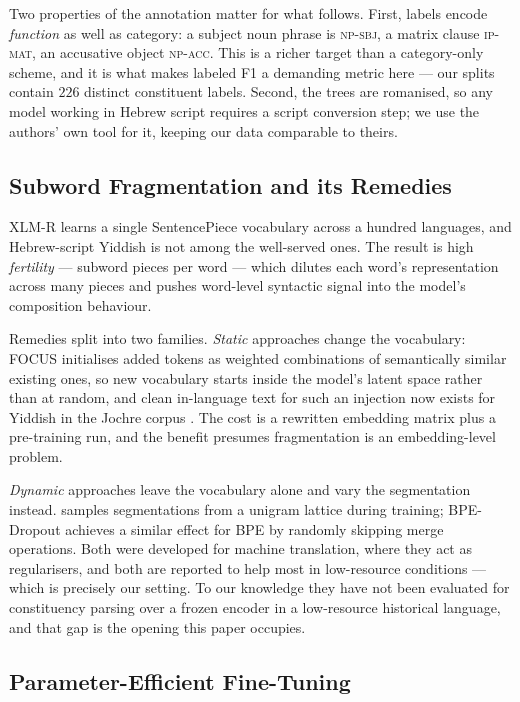\documentclass[11pt]{article}
\begin{document}
Two properties of the annotation matter for what follows. First, labels encode
\emph{function} as well as category: a subject noun phrase is \textsc{np-sbj}, a
matrix clause \textsc{ip-mat}, an accusative object \textsc{np-acc}. This is a
richer target than a category-only scheme, and it is what makes labeled F1 a
demanding metric here --- our splits contain $226$ distinct constituent labels.
Second, the trees are romanised, so any model working in Hebrew script requires a
script conversion step; we use the authors' own tool for it, keeping our data
comparable to theirs.

\subsection{Subword Fragmentation and its Remedies}

XLM-R \citep{conneau-etal-2020-unsupervised} learns a single SentencePiece
vocabulary across a hundred languages, and Hebrew-script Yiddish is not among the
well-served ones. The result is high \emph{fertility} --- subword pieces per word
--- which dilutes each word's representation across many pieces and pushes
word-level syntactic signal into the model's composition behaviour.

Remedies split into two families. \emph{Static} approaches change the
vocabulary: FOCUS \citep{dobler-de-melo-2023-focus} initialises added tokens as
weighted combinations of semantically similar existing ones, so new vocabulary
starts inside the model's latent space rather than at random, and clean
in-language text for such an injection now exists for Yiddish in the Jochre corpus
\citep{urieli-2025-jochre}. The cost is a rewritten embedding matrix plus a
pre-training run, and the benefit presumes fragmentation is an embedding-level
problem.

\emph{Dynamic} approaches leave the vocabulary alone and vary the segmentation
instead. \citet{kudo-2018-subword} samples segmentations from a unigram lattice
during training; BPE-Dropout \citep{provilkov-etal-2020-bpe} achieves a similar
effect for BPE by randomly skipping merge operations. Both were developed for
machine translation, where they act as regularisers, and both are reported to help
most in low-resource conditions --- which is precisely our setting. To our
knowledge they have not been evaluated for constituency parsing over a frozen
encoder in a low-resource historical language, and that gap is the opening this
paper occupies.

\subsection{Parameter-Efficient Fine-Tuning}
\end{document}
